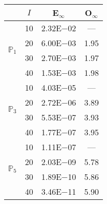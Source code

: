 \begin{table}[H]
\centering
\begin{tabular}{@{}l c c c@{}}
\toprule
 & $I$ & E$_{\infty}$ & O$_{\infty}$\\
\midrule
\multirow{4}{*}{$\mathbb{P}_{1}$}
 & 10 & 2.32E$-$02 & ---\\
 & 20 & 6.00E$-$03 & 1.95  \\
 & 30 & 2.70E$-$03 & 1.97  \\
 & 40 & 1.53E$-$03 & 1.98  \\
\midrule
\multirow{4}{*}{$\mathbb{P}_{3}$}
 & 10 & 4.03E$-$05 & ---\\
 & 20 & 2.72E$-$06 & 3.89  \\
 & 30 & 5.53E$-$07 & 3.93  \\
 & 40 & 1.77E$-$07 & 3.95  \\
\midrule
\multirow{4}{*}{$\mathbb{P}_{5}$}
 & 10 & 1.11E$-$07 & ---\\
 & 20 & 2.03E$-$09 & 5.78  \\
 & 30 & 1.89E$-$10 & 5.86  \\
 & 40 & 3.46E$-$11 & 5.90  \\
\bottomrule
\end{tabular}
\end{table}
